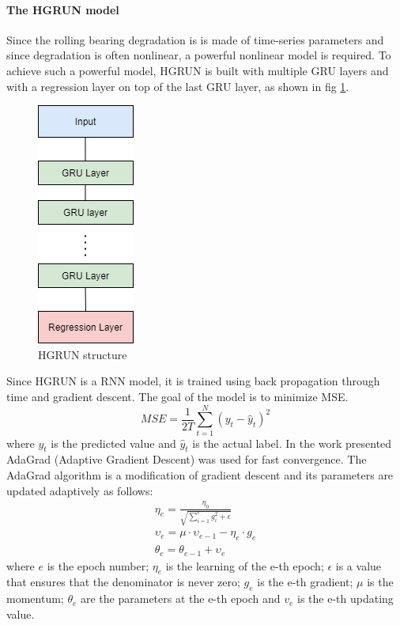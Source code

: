 \paragraph{The HGRUN model}

Since the rolling bearing degradation is is made of time-series parameters and since degradation is often nonlinear, a powerful
nonlinear model is required. To achieve such a powerful model, HGRUN is built with multiple GRU layers and with a regression layer
on top of the last GRU layer, as shown in fig \ref{fig:HGRUN_model}.

\begin{figure}[ht]
    \centering
    \includegraphics[scale=0.7]{gfx/HGRUN_model}
    \captionsetup{justification=centering}
    \caption{HGRUN structure}
    \label{fig:HGRUN_model}
\end{figure}

Since HGRUN is a RNN model, it is trained using back propagation through time and gradient descent.
The goal of the model is to minimize MSE.
\begin{equation}
    MSE = \frac{1}{2T}\sum_{t=1}^N (y_t-\hat{y}_t)^2
\end{equation}
where $y_t$ is the predicted value and $\hat{y}_t$ is the actual label. In the work presented AdaGrad
(Adaptive Gradient Descent) was used for fast convergence.
The AdaGrad algorithm is a modification of gradient descent and its parameters are updated
adaptively as follows:
\begin{equation}
    \begin{aligned}
        \eta_e = \frac{\eta_0}{\sqrt{\sum_{i=1}^e g_i^2 +\epsilon}} \\
        \upsilon_e = \mu \cdot \upsilon_{e-1} - \eta_e \cdot g_e    \\
        \theta_e = \theta_{e-1} + \upsilon_e
    \end{aligned}
\end{equation}
where $e$ is the epoch number; $\eta_e$ is the learning of the e-th epoch; $\epsilon$ is a value that ensures that the denominator
is never zero; $g_e$ is the e-th gradient; $\mu$ is the momentum; $\theta_e$ are the parameters at the e-th epoch and $v_e$ is the
e-th updating value.


